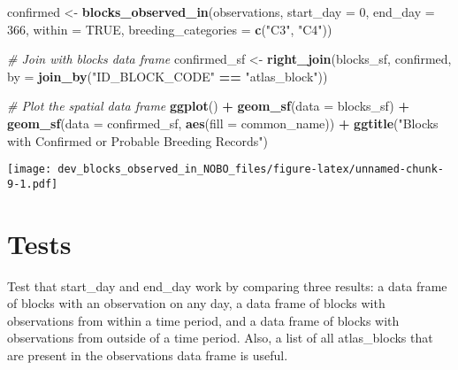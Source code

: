 \documentclass[
]{article}
\newenvironment{Shaded}{\begin{snugshade}}{\end{snugshade}}
\newcommand{\AttributeTok}[1]{\textcolor[rgb]{0.13,0.29,0.53}{#1}}
\newcommand{\CommentTok}[1]{\textcolor[rgb]{0.56,0.35,0.01}{\textit{#1}}}
\newcommand{\ConstantTok}[1]{\textcolor[rgb]{0.56,0.35,0.01}{#1}}
\newcommand{\DecValTok}[1]{\textcolor[rgb]{0.00,0.00,0.81}{#1}}
\newcommand{\FunctionTok}[1]{\textcolor[rgb]{0.13,0.29,0.53}{\textbf{#1}}}
\newcommand{\NormalTok}[1]{#1}
\newcommand{\OtherTok}[1]{\textcolor[rgb]{0.56,0.35,0.01}{#1}}
\newcommand{\SpecialCharTok}[1]{\textcolor[rgb]{0.81,0.36,0.00}{\textbf{#1}}}
\newcommand{\StringTok}[1]{\textcolor[rgb]{0.31,0.60,0.02}{#1}}
\begin{document}
\begin{Shaded}
\begin{Highlighting}[]
\NormalTok{confirmed }\OtherTok{\textless{}{-}} \FunctionTok{blocks\_observed\_in}\NormalTok{(observations, }\AttributeTok{start\_day =} \DecValTok{0}\NormalTok{, }
                                \AttributeTok{end\_day =} \DecValTok{366}\NormalTok{, }
                                \AttributeTok{within =} \ConstantTok{TRUE}\NormalTok{,}
                                \AttributeTok{breeding\_categories =} \FunctionTok{c}\NormalTok{(}\StringTok{"C3"}\NormalTok{, }\StringTok{"C4"}\NormalTok{))}

\CommentTok{\# Join with blocks data frame}
\NormalTok{confirmed\_sf }\OtherTok{\textless{}{-}} \FunctionTok{right\_join}\NormalTok{(blocks\_sf, confirmed, }
                   \AttributeTok{by =} \FunctionTok{join\_by}\NormalTok{(}\StringTok{"ID\_BLOCK\_CODE"} \SpecialCharTok{==} \StringTok{"atlas\_block"}\NormalTok{))}

\CommentTok{\# Plot the spatial data frame}
\FunctionTok{ggplot}\NormalTok{() }\SpecialCharTok{+}
  \FunctionTok{geom\_sf}\NormalTok{(}\AttributeTok{data =}\NormalTok{ blocks\_sf) }\SpecialCharTok{+}
  \FunctionTok{geom\_sf}\NormalTok{(}\AttributeTok{data =}\NormalTok{ confirmed\_sf, }\FunctionTok{aes}\NormalTok{(}\AttributeTok{fill =}\NormalTok{ common\_name)) }\SpecialCharTok{+}
  \FunctionTok{ggtitle}\NormalTok{(}\StringTok{"Blocks with Confirmed or Probable Breeding Records"}\NormalTok{)}
\end{Highlighting}
\end{Shaded}

\texttt{[image: dev\_blocks\_observed\_in\_NOBO\_files/figure-latex/unnamed-chunk-9-1.pdf]}

\section{Tests}\label{tests}

Test that start\_day and end\_day work by comparing three results: a
data frame of blocks with an observation on any day, a data frame of
blocks with observations from within a time period, and a data frame of
blocks with observations from outside of a time period. Also, a list of
all atlas\_blocks that are present in the observations data frame is
useful.
\end{document}
